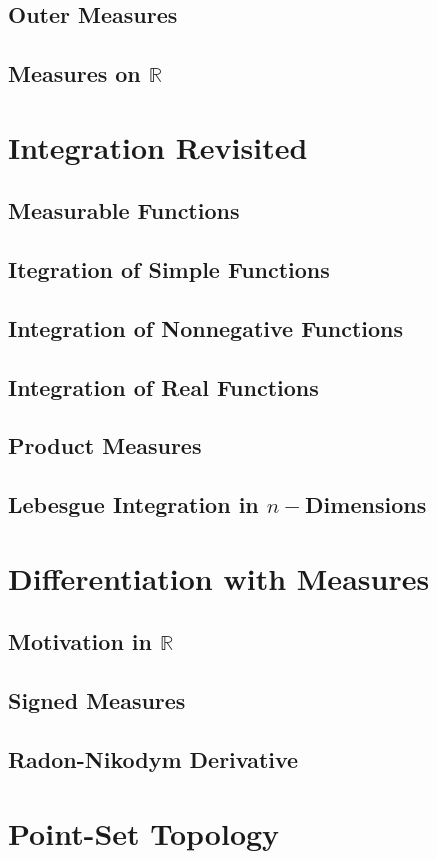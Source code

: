 \documentclass{article}
\newcommand{\R}{\mathbb{R}}
\theoremstyle{definition}
\begin{document}
\subsection{Outer Measures}
\subsection{Measures on $ \R $}
\section{Integration Revisited}
\subsection{Measurable Functions}
\subsection{Itegration of Simple Functions}
\subsection{Integration of Nonnegative Functions}
\subsection{Integration of Real Functions}
\subsection{Product Measures}
\subsection{Lebesgue Integration in $ n- $Dimensions}
\section{Differentiation with Measures}
\subsection{Motivation in $ \R $}
\subsection{Signed Measures}
\subsection{Radon-Nikodym Derivative}
\section{Point-Set Topology}
\end{document}
